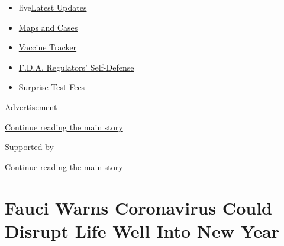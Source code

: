 \begin{itemize}
\tightlist
\item
  live\href{https://www.nytimes3xbfgragh.onion/2020/09/12/world/covid-19-coronavirus.html?name=styln-coronavirus-national\&region=TOP_BANNER\&block=storyline_menu_recirc\&action=click\&pgtype=Article\&impression_id=8e384541-f52c-11ea-8f04-2b90ba9625cc\&variant=undefined}{Latest
  Updates}
\item
  \href{https://www.nytimes3xbfgragh.onion/interactive/2020/us/coronavirus-us-cases.html?name=styln-coronavirus-national\&region=TOP_BANNER\&block=storyline_menu_recirc\&action=click\&pgtype=Article\&impression_id=8e384542-f52c-11ea-8f04-2b90ba9625cc\&variant=undefined}{Maps
  and Cases}
\item
  \href{https://www.nytimes3xbfgragh.onion/interactive/2020/science/coronavirus-vaccine-tracker.html?name=styln-coronavirus-national\&region=TOP_BANNER\&block=storyline_menu_recirc\&action=click\&pgtype=Article\&impression_id=8e384543-f52c-11ea-8f04-2b90ba9625cc\&variant=undefined}{Vaccine
  Tracker}
\item
  \href{https://www.nytimes3xbfgragh.onion/2020/09/10/us/politics/fda-coronavirus-vaccine.html?name=styln-coronavirus-national\&region=TOP_BANNER\&block=storyline_menu_recirc\&action=click\&pgtype=Article\&impression_id=8e384544-f52c-11ea-8f04-2b90ba9625cc\&variant=undefined}{F.D.A.
  Regulators' Self-Defense}
\item
  \href{https://www.nytimes3xbfgragh.onion/2020/09/09/upshot/coronavirus-surprise-test-fees.html?name=styln-coronavirus-national\&region=TOP_BANNER\&block=storyline_menu_recirc\&action=click\&pgtype=Article\&impression_id=8e384545-f52c-11ea-8f04-2b90ba9625cc\&variant=undefined}{Surprise
  Test Fees}
\end{itemize}

Advertisement

\protect\hyperlink{after-top}{Continue reading the main story}

Supported by

\protect\hyperlink{after-sponsor}{Continue reading the main story}

\hypertarget{fauci-warns-coronavirus-could-disrupt-life-well-into-new-year}{%
\section{Fauci Warns Coronavirus Could Disrupt Life Well Into New
Year}\label{fauci-warns-coronavirus-could-disrupt-life-well-into-new-year}}

